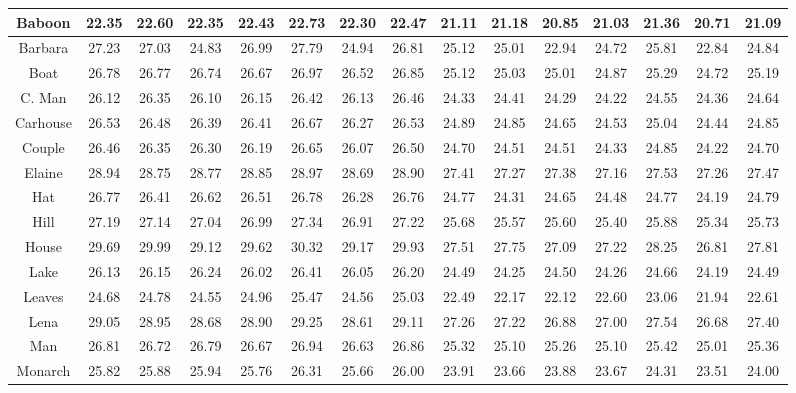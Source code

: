\begin{table*}[t]
\begin{center}
\begin{tabular}{|c||c|c|c|c|c|c|c||c|c|c|c|c|c|c|}
\\
\hline
 Baboon & 22.35  & 22.60 & 22.35 & 22.43  & 22.73& 22.30&22.47     &  21.11&  21.18  & 20.85  & 21.03  & 21.36&20.71 & 21.09
\\
\hline
 Barbara & 27.23  & 27.03  & 24.83  & 26.99 &  27.79&24.94 & 26.81    & 25.12  & 25.01  & 22.94   &  24.72& 25.81 &22.84 &24.84
\\
\hline
  Boat& 26.78 & 26.77  & 26.74  & 26.67 & 26.97  & 26.52 &  26.85   & 25.12 & 25.03 & 25.01 &  24.87&  25.29 & 24.72 &25.19         
\\
\hline
 C. Man   & 26.12 & 26.35   & 26.10 & 26.15 & 26.42& 26.13 & 26.46   & 24.33 & 24.41 &  24.29  & 24.22 &  24.55&24.36 &24.64     
\\
\hline
 Carhouse  & 26.53 & 26.48  &  26.39   & 26.41 & 26.67&26.27 &26.53   &  24.89 & 24.85  &  24.65  & 24.53  &25.04 &24.44&24.85
\\
\hline
 Couple & 26.46 & 26.35  & 26.30 & 26.19 &  26.65&26.07 & 26.50   & 24.70 & 24.51 & 24.51 & 24.33 & 24.85&24.22 &24.70   
\\
\hline
 Elaine &  28.94 & 28.75 & 28.77   & 28.85 & 28.97 &28.69 &28.90    &   27.41  & 27.27 & 27.38  &  27.16 &27.53 &27.26&27.47   
\\
\hline
 Hat  &  26.77 & 26.41 & 26.62  & 26.51 & 26.78& 26.28 &26.76      &   24.77  & 24.31  & 24.65   &  24.48 &24.77&24.19 & 24.79
\\
\hline
 Hill  & 27.19 & 27.14  & 27.04 & 26.99   &27.34& 26.91 &27.22     & 25.68 & 25.57 & 25.60 &  25.40 & 25.88 &25.34 & 25.73
\\
\hline
 House  & 29.69 & 29.99  & 29.12  & 29.62  & 30.32& 29.17 &29.93     & 27.51 & 27.75  &  27.09 &  27.22 & 28.25 &26.81 & 27.81    
\\
\hline
 Lake   &  26.13  & 26.15  & 26.24  &  26.02  & 26.41& 26.05 &26.20    & 24.49 & 24.25 & 24.50 & 24.26 &24.66&24.19 &24.49   
\\
\hline
 Leaves   & 24.68 & 24.78   & 24.55  & 24.96 & 25.47&24.56 &25.03     & 22.49  & 22.17 & 22.12 &  22.60 & 23.06 &21.94& 22.61
\\
\hline
 Lena  & 29.05 & 28.95 & 28.68 & 28.90 &  29.25 &28.61 & 29.11      & 27.26 & 27.22 &  26.88 & 27.00 & 27.54&26.68 &  27.40   
\\
\hline
 Man   & 26.81 & 26.72    & 26.79 & 26.67 &  26.94&26.63 &  26.86   & 25.32 & 25.10  & 25.26  & 25.10 &  25.42 &25.01& 25.36      
\\
\hline
 Monarch  & 25.82 & 25.88 & 25.94 & 25.76 & 26.31&25.66 & 26.00   & 23.91 & 23.66  &  23.88   &  23.67& 24.31 &23.51 & 24.00   

\end{tabular}
\end{center}
\end{table*}
